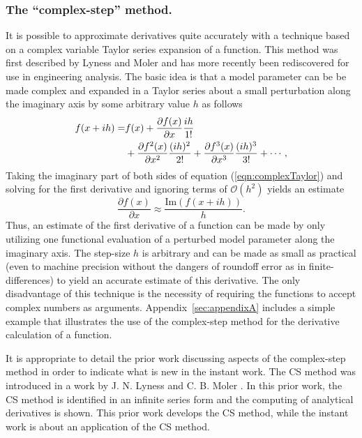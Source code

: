 \documentclass[preprint,12pt]{elsarticle}
\begin{document}
\subsubsection{The ``complex-step'' method.}  \label{sec:CSmethod} It is
possible to approximate derivatives quite accurately with a technique based on
a complex variable Taylor series expansion of a function.  This method was
first described by Lyness and Moler
\cite{lyness1967numerical,lyness1968differentiation} and has more recently been
rediscovered for use in engineering analysis.  The basic idea is that a model parameter can
be be made complex and expanded in a Taylor series about a small perturbation
along the imaginary axis by some arbitrary value $h$ as follows
%
\begin{align} f ( x + i h ) =& f(x) + \frac{\partial f(x)}{\partial x} \frac{i
h}{1!}  \notag \\ &+ \frac{\partial f^2(x)}{\partial x^2} \frac{(i h)^2}{2!} +
\frac{\partial f^3(x)}{\partial x^3} \frac{(i h)^3}{3!} + \cdots,
\label{eqn:complexTaylor} \end{align}
%
Taking the imaginary part of both sides of equation (\ref{eqn:complexTaylor})
and solving for the first derivative and ignoring terms of $\mathcal{O}\left (
h^2 \right)$ yields an estimate
%
\begin{equation} \frac{\partial f( x )}{\partial x} \approx \frac{\mbox{Im}
\left( f (x + i h) \right)}{h}.  \label{eqn:complexFirstDeriv} \end{equation}
%
Thus, an estimate of the first derivative of a function can be made by only
utilizing one functional evaluation of a perturbed model parameter along the
imaginary axis.  The step-size $h$ is arbitrary and can be made as small as
practical (even to machine precision without the dangers of roundoff error as
in finite-differences) to yield an accurate estimate of this derivative.  The
only disadvantage of this technique is the necessity of requiring the functions
to accept complex numbers as arguments. Appendix~\ref{sec:appendixA} includes a
simple example that illustrates the use of the complex-step method for the
derivative calculation of a function. 

It is appropriate to detail the prior work discussing aspects of the
complex-step method in order to indicate what is new in the instant work.  The
CS method was introduced in a work by J. N. Lyness and C. B. Moler
\cite{lyness1967numerical}.  In this prior work, the CS method is identified in
an infinite series form and the computing of analytical derivatives is shown. This prior
work develops the CS method, while the instant work is about an application of
the CS method.
\end{document}
